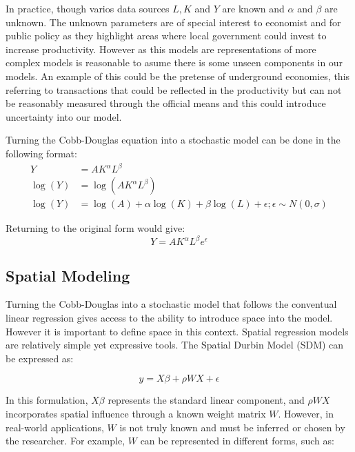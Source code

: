 \documentclass{article}
\begin{document}
In practice, though varios data sources $L,K$ and $Y$ are known and $\alpha$ and $\beta$ are unknown. The unknown
parameters are of special interest to economist and for public policy as they highlight areas where local government
could invest to increase productivity. However as this models are representations of more complex models is
reasonable to asume there is some unseen components in our models. An example of this could be the pretense of
underground economies, this referring to transactions that could be reflected in the productivity but can not
be reasonably measured through the official means and this could introduce uncertainty into our model.

Turning the Cobb-Douglas equation into a stochastic model can be done in the following format:
\[
	\begin{split}
		Y         & = A K^\alpha L^\beta                                                             \\
		\log{(Y)} & = \log{(A K^\alpha L^\beta)}                                                     \\
		\log(Y)   & = \log(A) + \alpha \log(K) + \beta \log(L) +\epsilon ; \epsilon \sim N(0,\sigma)
	\end{split}
\]

Returning to the original form would give:
\begin{equation}
	Y = A K^\alpha L^\beta e^{\epsilon}
\end{equation}

\subsection{Spatial Modeling}

Turning the Cobb-Douglas into a stochastic model that follows the conventual linear regression gives access
to the ability to introduce space into the model. However it is important to define space in this context.
Spatial regression models are relatively simple yet expressive tools. The Spatial Durbin Model (SDM) can be expressed as:

\begin{equation}
	y = X \beta + \rho W X + \epsilon
\end{equation}

In this formulation, $X \beta$ represents the standard linear component, and $\rho W X$ incorporates spatial influence through a known weight matrix $W$. However, in real-world applications, $W$ is not truly known and must be inferred or chosen by the researcher. For example, $W$ can be represented in different forms, such as:
\end{document}
